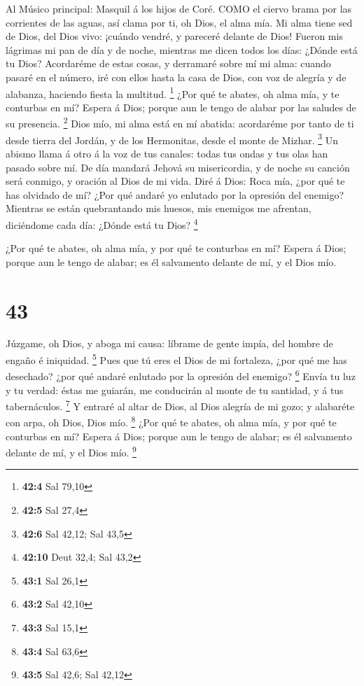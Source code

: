  Al Músico principal: Masquil á los hijos de Coré. COMO el
ciervo brama por las corrientes de las aguas, así clama por ti, oh Dios,
el alma mía.  Mi alma tiene sed de Dios, del Dios vivo:
¡cuándo vendré, y pareceré delante de Dios!  Fueron mis
lágrimas mi pan de día y de noche, mientras me dicen todos los días:
¿Dónde está tu Dios?  Acordaréme de estas cosas, y derramaré
sobre mí mi alma: cuando pasaré en el número, iré con ellos hasta la
casa de Dios, con voz de alegría y de alabanza, haciendo fiesta la
multitud. \footnote{\textbf{42:4} Sal 79,10}  ¿Por qué te
abates, oh alma mía, y te conturbas en mí? Espera á Dios; porque aun le
tengo de alabar por las saludes de su presencia. \footnote{\textbf{42:5}
  Sal 27,4}  Dios mío, mi alma está en mí abatida:
acordaréme por tanto de ti desde tierra del Jordán, y de los Hermonitas,
desde el monte de Mizhar. \footnote{\textbf{42:6} Sal 42,12; Sal 43,5}
 Un abismo llama á otro á la voz de tus canales: todas tus
ondas y tus olas han pasado sobre mí.  De día mandará Jehová
su misericordia, y de noche su canción será conmigo, y oración al Dios
de mi vida.  Diré á Dios: Roca mía, ¿por qué te has olvidado
de mí? ¿Por qué andaré yo enlutado por la opresión del enemigo?
 Mientras se están quebrantando mis huesos, mis enemigos me
afrentan, diciéndome cada día: ¿Dónde está tu Dios? \footnote{\textbf{42:10}
  Deut 32,4; Sal 43,2}

 ¿Por qué te abates, oh alma mía, y por qué te conturbas en
mí? Espera á Dios; porque aun le tengo de alabar; es él salvamento
delante de mí, y el Dios mío.

\hypertarget{section-42}{%
\section{43}\label{section-42}}

 Júzgame, oh Dios, y aboga mi causa: líbrame de gente impía,
del hombre de engaño é iniquidad. \footnote{\textbf{43:1} Sal 26,1}
 Pues que tú eres el Dios de mi fortaleza, ¿por qué me has
desechado? ¿por qué andaré enlutado por la opresión del enemigo?
\footnote{\textbf{43:2} Sal 42,10}  Envía tu luz y tu
verdad: éstas me guiarán, me conducirán al monte de tu santidad, y á tus
tabernáculos. \footnote{\textbf{43:3} Sal 15,1}  Y entraré
al altar de Dios, al Dios alegría de mi gozo; y alabaréte con arpa, oh
Dios, Dios mío. \footnote{\textbf{43:4} Sal 63,6}  ¿Por qué
te abates, oh alma mía, y por qué te conturbas en mí? Espera á Dios;
porque aun le tengo de alabar; es él salvamento delante de mí, y el Dios
mío. \footnote{\textbf{43:5} Sal 42,6; Sal 42,12}

